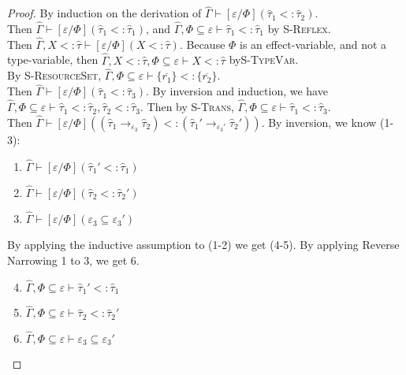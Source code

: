 \documentclass{llncs}
\begin{document}
\begin{proof} By induction on the derivation of $\hat \Gamma \vdash [\varepsilon/\Phi](\hat \tau_1 <: \hat \tau_2)$.\\

 Then $\hat \Gamma \vdash [\varepsilon/\Phi](\hat \tau_1 <: \hat \tau_1)$, and $\hat \Gamma, \Phi \subseteq \varepsilon \vdash \hat \tau_1 <: \hat \tau_1$ by \textsc{S-Reflex}.\\

 Then $\hat \Gamma, X <: \hat \tau \vdash [\varepsilon/\Phi](X <: \hat \tau)$. Because $\Phi$ is an effect-variable, and not a type-variable, then $\hat \Gamma, X <: \hat \tau, \Phi \subseteq \varepsilon \vdash X <: \hat \tau$ by\textsc{S-TypeVar}.\\

 By \textsc{S-ResourceSet}, $\hat \Gamma, \Phi \subseteq \varepsilon \vdash \{ \overline{r_1} \} <: \{ \overline{r_2} \}$.\\

 Then $\hat \Gamma \vdash [\varepsilon/\Phi](\hat \tau_1 <: \hat \tau_3)$. By inversion and induction, we have $\hat \Gamma, \Phi \subseteq \varepsilon \vdash \hat \tau_1 <: \hat \tau_2, \hat \tau_2 <: \hat \tau_3$. Then by \textsc{S-Trans}, $\hat \Gamma, \Phi \subseteq \varepsilon \vdash \hat \tau_1 <: \hat \tau_3$.\\

 Then $\hat \Gamma \vdash  [\varepsilon/\Phi]((\hat \tau_1 \rightarrow_{\varepsilon_3} \hat \tau_2) <: (\hat \tau_1' \rightarrow_{\varepsilon_3'} \hat \tau_2'))$. By inversion, we know (1-3):

\begin{enumerate}
	\item $\hat \Gamma \vdash [\varepsilon/\Phi](\hat \tau_1' <: \hat \tau_1)$
	\item $\hat \Gamma \vdash [\varepsilon/\Phi](\hat \tau_2 <: \hat \tau_2')$
	\item $\hat \Gamma \vdash [\varepsilon/\Phi](\varepsilon_3 \subseteq \varepsilon_3')$
\end{enumerate}

\noindent
By applying the inductive assumption to (1-2) we get (4-5). By applying Reverse Narrowing 1 to 3, we get 6.

\begin{enumerate}
	\setcounter{enumi}{3}
	\item $\hat \Gamma, \Phi \subseteq \varepsilon \vdash \hat \tau_1' <: \hat \tau_1$
	\item $\hat \Gamma, \Phi \subseteq \varepsilon \vdash \hat \tau_2 <: \hat \tau_2'$
	\item $\hat \Gamma, \Phi \subseteq \varepsilon \vdash \varepsilon_3 \subseteq \varepsilon_3'$
\end{enumerate}


\end{proof}
\end{document}
